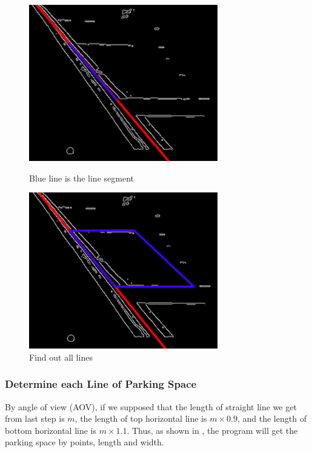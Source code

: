 \documentclass[journal,article,submit,moreauthors,pdftex,10pt,a4paper]{mdpi}
\begin{document}
\begin{figure}[tbp]
	\begin{minipage}{.4\textwidth}
		\centering
		\includegraphics[scale=0.5,natwidth=311,natheight=258]{Figures/lineSegment.png}
		\caption{Blue line is the line segment}
		\label{fig:lineSegment}
	\end{minipage}
	\hspace{0.5in}
	\begin{minipage}{.4\textwidth}
		\centering
		\includegraphics[scale=0.5,natwidth=311,natheight=258]{Figures/fourLines.png}
		\caption{Find out all lines}
		\label{fig:fourLines}
	\end{minipage}
\end{figure}

\subsubsection{Determine each Line of Parking Space}

By angle of view (AOV)\cite{AOV}, if we supposed that the length of
straight line we get from last step is $m$, the length of top horizontal
line is $m \times 0.9$, and the length of bottom horizontal line is $m \times 1.1$.
Thus, as shown in , the program will get the parking
space by points, length and width.
\end{document}
